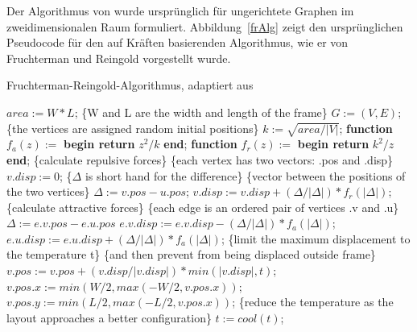 \documentclass[12pt, a4paper]{article}
\begin{document}
Der Algorithmus von  wurde ursprünglich für ungerichtete Graphen im zweidimensionalen Raum formuliert. Abbildung~\ref{frAlg} zeigt den ursprünglichen Pseudocode für den auf Kräften basierenden Algorithmus, wie er von Fruchterman und Reingold vorgestellt wurde.\\

\begin{algorithm}
	\caption{Fruchterman-Reingold-Algorithmus, adaptiert aus \protect{}}\label{frAlg}
	\begin{algorithmic}
	\State $area:=W*L$; \{W and L are the width and length of the frame\}
	\State $G:=(V,E)$; \{the vertices are assigned random initial positions\}
    \State $k:=\sqrt{area/|V|}$;
    \State \textbf{function} $f_a(z) :=$ \textbf{begin return} $z^2/k$ \textbf{end};
    \State \textbf{function} $f_r(z) :=$ \textbf{begin return} $k^2/z$ \textbf{end};
    	\State \{calculate repulsive forces\}
        	\State \{each vertex has two vectors: .pos and .disp\}
            \State $v.disp := 0$;
                	\State \{$\Delta$ is short hand for the difference\}
                    \State \{vector between the positions of the two vertices\}
                    \State $\Delta := v.pos - u.pos$;
                    \State $v.disp := v.disp + (\Delta / |\Delta|) * f_r(|\Delta|)$;
                \EndIf
            \EndFor
        \EndFor
        \State \{calculate attractive forces\}
        	\State \{each edge is an ordered pair of vertices .v and .u\}
            \State $\Delta := e.v.pos - e.u.pos$
            \State $e.v.disp := e.v.disp - (\Delta / |\Delta|) * f_a(|\Delta|)$;
            \State $e.u.disp := e.u.disp + (\Delta / |\Delta|) * f_a(|\Delta|)$;
        \EndFor
        \State \{limit the maximum displacement to the temperature t\}
        \State \{and then prevent from being displaced outside frame\}
        	\State $v.pos := v.pos + (v.disp / |v.disp|) * min(|v.disp|, t)$;
            \State $v.pos.x := min(W/2, max(-W/2, v.pos.x))$;
            \State $v.pos.y := min(L/2, max(-L/2, v.pos.x))$;
        \EndFor
        \State \{reduce the temperature as the layout approaches a better configuration\}
        \State $t := cool(t)$;
    \EndFor
	\end{algorithmic}
\end{algorithm}
\end{document}
